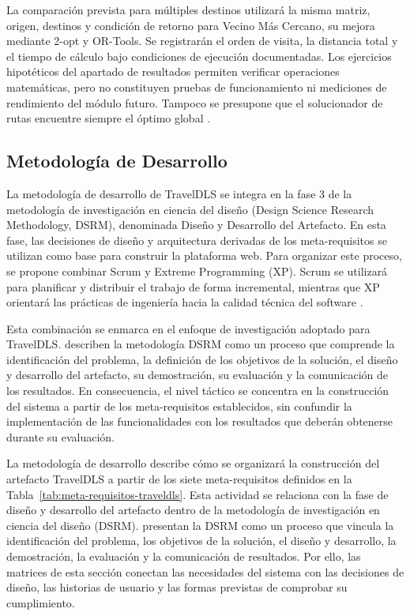 La comparación prevista para múltiples destinos utilizará la misma matriz, origen, destinos y condición de retorno para Vecino Más Cercano, su mejora mediante 2-opt y OR-Tools. Se registrarán el orden de visita, la distancia total y el tiempo de cálculo bajo condiciones de ejecución documentadas. Los ejercicios hipotéticos del apartado de resultados permiten verificar operaciones matemáticas, pero no constituyen pruebas de funcionamiento ni mediciones de rendimiento del módulo futuro. Tampoco se presupone que el solucionador de rutas encuentre siempre el óptimo global \parencite{googleTSP}.

\subsection{Metodología de Desarrollo}
\label{sec:metodologia-desarrollo}

La metodología de desarrollo de TravelDLS se integra en la fase 3 de la metodología de investigación en ciencia del diseño (Design Science Research Methodology, DSRM), denominada Diseño y Desarrollo del Artefacto. En esta fase, las decisiones de diseño y arquitectura derivadas de los meta-requisitos se utilizan como base para construir la plataforma web. Para organizar este proceso, se propone combinar Scrum y Extreme Programming (XP). Scrum se utilizará para planificar y distribuir el trabajo de forma incremental, mientras que XP orientará las prácticas de ingeniería hacia la calidad técnica del software \parencite{beck2000xp, schwaber2020scrum}.

Esta combinación se enmarca en el enfoque de investigación adoptado para TravelDLS. \textcite{peffers2007dsrm} describen la metodología DSRM como un proceso que comprende la identificación del problema, la definición de los objetivos de la solución, el diseño y desarrollo del artefacto, su demostración, su evaluación y la comunicación de los resultados. En consecuencia, el nivel táctico se concentra en la construcción del sistema a partir de los meta-requisitos establecidos, sin confundir la implementación de las funcionalidades con los resultados que deberán obtenerse durante su evaluación.

La metodología de desarrollo describe cómo se organizará la construcción del artefacto TravelDLS a partir de los siete meta-requisitos definidos en la Tabla~\ref{tab:meta-requisitos-traveldls}. Esta actividad se relaciona con la fase de diseño y desarrollo del artefacto dentro de la metodología de investigación en ciencia del diseño (DSRM). \textcite{peffers2007dsrm} presentan la DSRM como un proceso que vincula la identificación del problema, los objetivos de la solución, el diseño y desarrollo, la demostración, la evaluación y la comunicación de resultados. Por ello, las matrices de esta sección conectan las necesidades del sistema con las decisiones de diseño, las historias de usuario y las formas previstas de comprobar su cumplimiento.

